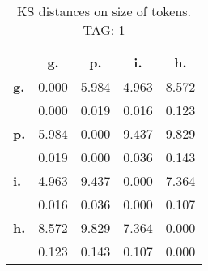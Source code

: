 \begin{table}[h!]
\begin{center}
\begin{tabular}{| l || c | c | c | c |}\hline
 & {\bf g.} & {\bf p.} & {\bf i.} & {\bf h.} \\\hline\hline
{\bf g.} & 0.000 & 5.984 & 4.963 & 8.572 \\
{\bf } & 0.000 & 0.019 & 0.016 & 0.123 \\\hline
{\bf p.} & 5.984 & 0.000 & 9.437 & 9.829 \\
{\bf } & 0.019 & 0.000 & 0.036 & 0.143 \\\hline
{\bf i.} & 4.963 & 9.437 & 0.000 & 7.364 \\
{\bf } & 0.016 & 0.036 & 0.000 & 0.107 \\\hline
{\bf h.} & 8.572 & 9.829 & 7.364 & 0.000 \\
{\bf } & 0.123 & 0.143 & 0.107 & 0.000 \\\hline
\end{tabular}
\caption{KS distances on size of tokens. TAG: 1}
\end{center}
\end{table}
